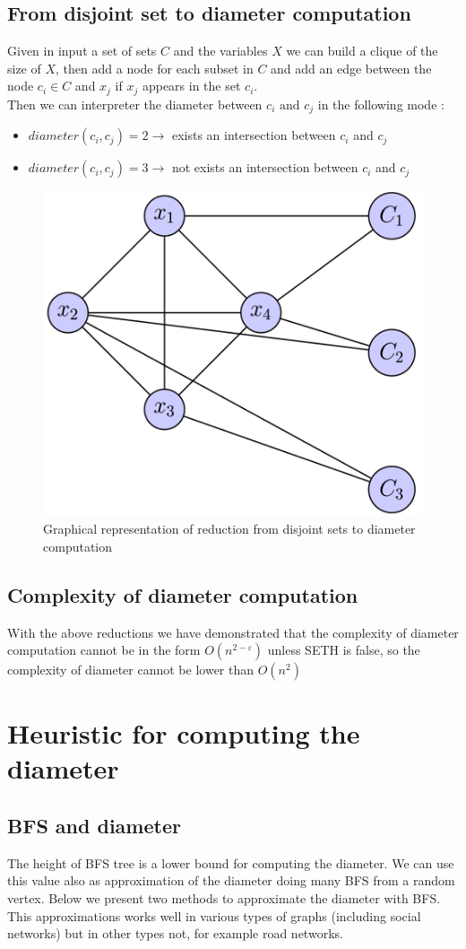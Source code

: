 \subsection{From disjoint set to diameter computation}
Given in input a set of sets $ C $ and the variables $ X $ we can build a clique of the size of  $ X $, then add a node for each subset in $ C $ and add an edge between the node  $ c_i \in C $  and $ x_j $ if $ x_j $ appears in the set $ c_i $.\\
Then we can interpreter the diameter between $ c_i \text{ and } c_j $ in the following mode :
\begin{itemize}
	\item $ diameter(c_i, c_j) = 2  \rightarrow $  exists an intersection between $ c_i $ and $ c_j $
	\item $ diameter(c_i, c_j) = 3  \rightarrow $ not exists an intersection between $ c_i $ and $ c_j $
\end{itemize}
\begin{figure}[H]
	\centering
	\includegraphics[width=0.5\linewidth]{img/disjoint_set_to_diameter}
	\caption{Graphical representation of reduction from disjoint sets to diameter computation}
	\label{fig:disjointsettodiameter}
\end{figure}
\subsection{Complexity of diameter computation}
With the above reductions we have demonstrated that the complexity of diameter computation cannot be in the form $ O(n^{2 - \varepsilon}) $ unless SETH is false, so the complexity of diameter cannot be lower than $ O(n^2)  $
\section{Heuristic for computing the diameter}
\subsection{BFS and diameter}
The height of BFS tree is a lower bound for computing the diameter. We can use this value also as approximation of the diameter doing many BFS from a random vertex. Below we present two methods to approximate the diameter with BFS. This approximations works well in various types of graphs (including social networks) but in other types not, for example road networks.
